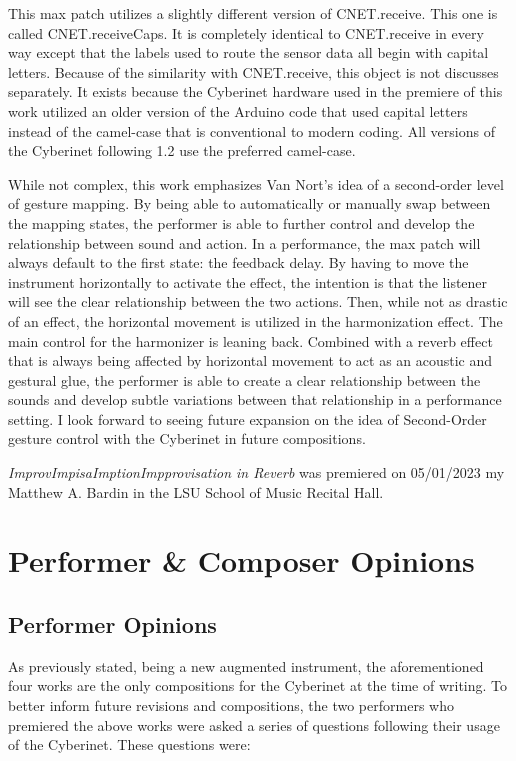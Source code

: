 This max patch utilizes a slightly different version of CNET.receive. This one is called CNET.receiveCaps. It is completely identical to CNET.receive in every way except that the labels used to route the sensor data all begin with capital letters. Because of the similarity with CNET.receive, this object is not discusses separately. It exists because the Cyberinet hardware used in the premiere of this work utilized an older version of the Arduino code that used capital letters instead of the camel-case that is conventional to modern coding. All versions of the Cyberinet following 1.2 use the preferred camel-case.

While not complex, this work emphasizes Van Nort's idea of a second-order level of gesture mapping\cite{vanNortMapping2007}. By being able to automatically or manually swap between the mapping states, the performer is able to further control and develop the relationship between sound and action. In a performance, the max patch will always default to the first state: the feedback delay. By having to move the instrument horizontally to activate the effect, the intention is that the listener will see the clear relationship between the two actions. Then, while not as drastic of an effect, the horizontal movement is utilized in the harmonization effect. The main control for the harmonizer is leaning back. Combined with a reverb effect that is always being affected by horizontal movement to act as an acoustic and gestural glue, the performer is able to create a clear relationship between the sounds and develop subtle variations between that relationship in a performance setting. I look forward to seeing future expansion on the idea of Second-Order gesture control with the Cyberinet in future compositions.

\textit{ImprovImpisaImptionImpprovisation in Reverb} was premiered on 05/01/2023 my Matthew A. Bardin in the LSU School of Music Recital Hall.

\section{Performer \& Composer Opinions}

\subsection{Performer Opinions}

As previously stated, being a new augmented instrument, the aforementioned four works are the only compositions for the Cyberinet at the time of writing. To better inform future revisions and compositions, the two performers who premiered the above works were asked a series of questions following their usage of the Cyberinet. These questions were:

